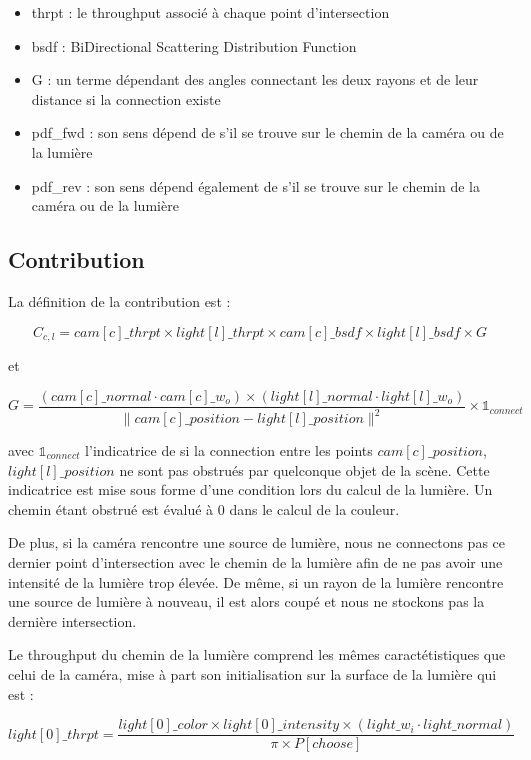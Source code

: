 \begin{itemize}
    \item thrpt : le throughput associé à chaque point d'intersection
    \item bsdf : BiDirectional Scattering Distribution Function
    \item G : un terme dépendant des angles connectant les deux rayons et de leur distance si la connection existe
    \item pdf\_fwd : son sens dépend de s'il se trouve sur le chemin de la caméra ou de la lumière
    \item pdf\_rev : son sens dépend également de s'il se trouve sur le chemin de la caméra ou de la lumière
\end{itemize}

\subsection{Contribution}

La définition de la contribution est :

$$
C_{c,l} = cam[c]\_thrpt \times light[l]\_thrpt \times cam[c]\_bsdf \times light[l]\_bsdf \times G
$$

et

$$
G = \dfrac{(cam[c]\_normal \cdot cam[c]\_w_o) \times (light[l]\_normal \cdot light[l]\_w_o)}{\lVert cam[c]\_position - light[l]\_position \rVert^2} \times \mathds{1}_{connect}
$$

avec $\mathds{1}_{connect}$ l'indicatrice de si la connection entre les points $ cam[c]\_position$, $light[l]\_position$ ne sont pas obstrués par quelconque objet de la scène. Cette indicatrice est mise sous forme d'une condition lors du calcul de la lumière. Un chemin étant obstrué est évalué à 0 dans le calcul de la couleur.

De plus, si la caméra rencontre une source de lumière, nous ne connectons pas ce dernier point d'intersection avec le chemin de la lumière afin de ne pas avoir une intensité de la lumière trop élevée. De même, si un rayon de la lumière rencontre une source de lumière à nouveau, il est alors coupé et nous ne stockons pas la dernière intersection.

Le throughput du chemin de la lumière comprend les mêmes caractétistiques que celui de la caméra, mise à part son initialisation sur la surface de la lumière qui est :

$$
light[0]\_thrpt = \dfrac{light[0]\_color \times light[0]\_intensity \times (light\_w_i \cdot light\_normal)}{\pi \times P[choose]}
$$

